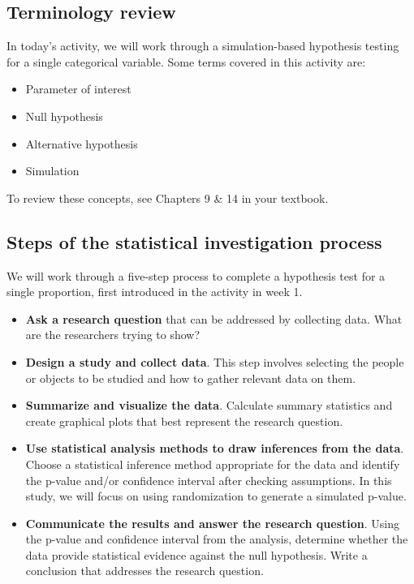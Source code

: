 \documentclass[
]{report}
\begin{document}
\subsection{Terminology review}\label{terminology-review-3}

In today's activity, we will work through a simulation-based hypothesis testing for a single categorical variable. Some terms covered in this activity are:

\begin{itemize}
\item
  Parameter of interest
\item
  Null hypothesis
\item
  Alternative hypothesis
\item
  Simulation
\end{itemize}

To review these concepts, see Chapters 9 \& 14 in your textbook.

\subsection{Steps of the statistical investigation process}\label{steps-of-the-statistical-investigation-process-1}

We will work through a five-step process to complete a hypothesis test for a single proportion, first introduced in the activity in week 1.

\begin{itemize}
\item
  \textbf{Ask a research question} that can be addressed by collecting data. What are the researchers trying to show?
\item
  \textbf{Design a study and collect data}. This step involves selecting the people or objects to be studied and how to gather relevant data on them.
\item
  \textbf{Summarize and visualize the data}. Calculate summary statistics and create graphical plots that best represent the research question.
\item
  \textbf{Use statistical analysis methods to draw inferences from the data}. Choose a statistical inference method appropriate for the data and identify the p-value and/or confidence interval after checking assumptions. In this study, we will focus on using randomization to generate a simulated p-value.
\item
  \textbf{Communicate the results and answer the research question}. Using the p-value and confidence interval from the analysis, determine whether the data provide statistical evidence against the null hypothesis. Write a conclusion that addresses the research question.
\end{itemize}
\end{document}
